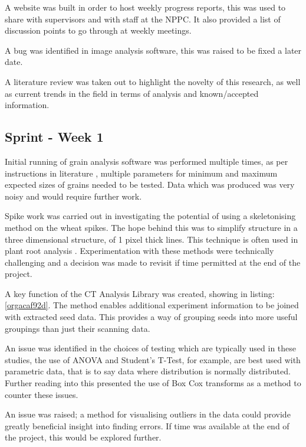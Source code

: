 \documentclass[11pt]{report}
\begin{document}
A website was built in order to host weekly progress reports, this was used to share with supervisors and with staff at the NPPC. It also provided a list of discussion points to go through at weekly meetings.

A bug was identified in image analysis software, this was raised to be fixed a later date.

A literature review was taken out to highlight the novelty of this research, as well as current trends in the field in terms of analysis and known/accepted information.

\subsection{Sprint - Week 1}
\label{sec:orgec3ae57}

Initial running of grain analysis software was performed multiple times, as per instructions in literature \cite{Hughes2017}, multiple parameters for minimum and maximum expected sizes of grains needed to be tested. Data which was produced was very noisy and would require further work.

Spike work was carried out in investigating the potential of using a skeletonising method on the wheat spikes. The hope behind this was to simplify structure in a three dimensional structure, of 1 pixel thick lines. This technique is often used in plant root analysis \cite{Mairhofer2015,Daly2017}. Experimentation with these methods were technically challenging and a decision was made to revisit if time permitted at the end of the project.

A key function of the CT Analysis Library was created, showing in listing:\ref{orgacaf92d}. The method enables additional experiment information to be joined with extracted seed data. This provides a way of grouping seeds into more useful groupings than just their scanning data.

An issue was identified in the choices of testing which are typically used in these studies, the use of ANOVA and Student's T-Test, for example, are best used with parametric data, that is to say data where distribution is normally distributed. Further reading into this presented the use of Box Cox transforms as a method to counter these issues.

An issue was raised; a method for visualising outliers in the data could provide greatly beneficial insight into finding errors. If time was available at the end of the project, this would be explored further.
\end{document}
